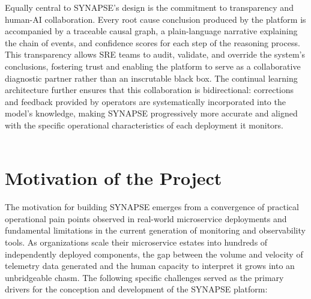 \hspace*{0.3in} Equally central to SYNAPSE's design is the commitment to transparency and human-AI collaboration. Every root cause conclusion produced by the platform is accompanied by a traceable causal graph, a plain-language narrative explaining the chain of events, and confidence scores for each step of the reasoning process. This transparency allows SRE teams to audit, validate, and override the system's conclusions, fostering trust and enabling the platform to serve as a collaborative diagnostic partner rather than an inscrutable black box. The continual learning architecture further ensures that this collaboration is bidirectional: corrections and feedback provided by operators are systematically incorporated into the model's knowledge, making SYNAPSE progressively more accurate and aligned with the specific operational characteristics of each deployment it monitors.\\\\

\section{Motivation of the Project}

\hspace*{0.3in} The motivation for building SYNAPSE emerges from a convergence of practical operational pain points observed in real-world microservice deployments and fundamental limitations in the current generation of monitoring and observability tools. As organizations scale their microservice estates into hundreds of independently deployed components, the gap between the volume and velocity of telemetry data generated and the human capacity to interpret it grows into an unbridgeable chasm. The following specific challenges served as the primary drivers for the conception and development of the SYNAPSE platform:\\\\

